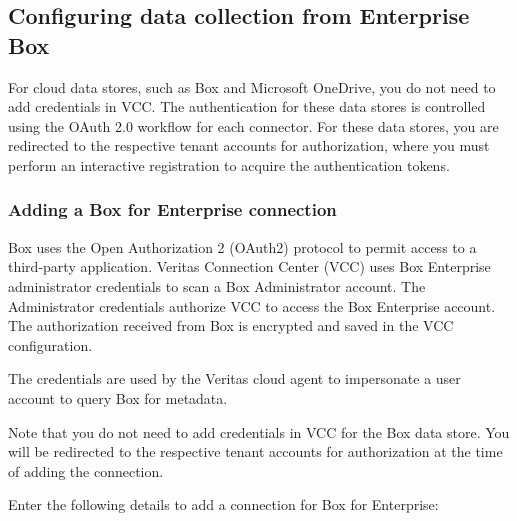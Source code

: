 \documentclass[letterpaper,10pt,english]{sphinxmanual}
\begin{document}
\subsection{Configuring data collection from Enterprise Box}
\label{\detokenize{mcdmp_app_ug:configuring-data-collection-from-enterprise-box}}
For cloud data stores, such as Box and Microsoft OneDrive, you do not need to add credentials in VCC. The authentication for these data stores is controlled using
the OAuth 2.0 workflow for each connector. For these data stores, you are redirected to the respective tenant accounts for authorization, where you must perform an
interactive registration to acquire the authentication tokens.


\subsubsection{Adding a Box for Enterprise connection}
\label{\detokenize{mcdmp_app_ug:adding-a-box-for-enterprise-connection}}
Box uses the Open Authorization 2 (OAuth2) protocol to permit access to a third-party application. Veritas Connection Center (VCC) uses Box Enterprise administrator credentials to scan a Box Administrator account. The Administrator credentials authorize VCC to access the Box Enterprise account. The authorization received from Box is encrypted and saved in the VCC configuration.

The credentials are used by the Veritas cloud agent to impersonate a user account to query Box for metadata.

Note that you do not need to add credentials in VCC for the Box data store. You will be redirected to the respective tenant accounts for authorization at the time of adding the connection.

Enter the following details to add a connection for Box for Enterprise:
\end{document}
